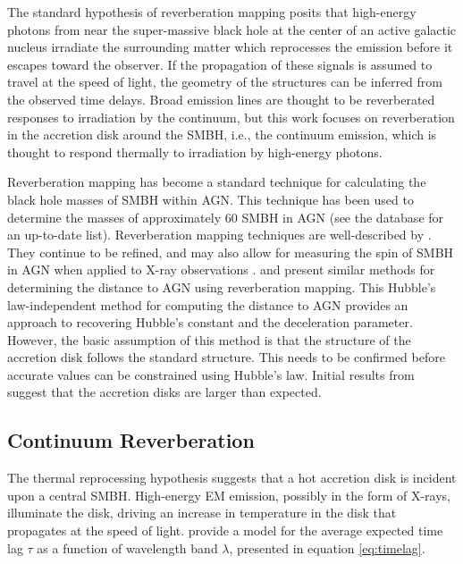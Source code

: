 \documentclass[11pt,letterpaper]{article}
\begin{document}
The standard hypothesis of reverberation mapping posits that high-energy photons from near the super-massive black hole at the center of an active galactic nucleus irradiate the surrounding matter which reprocesses the emission before it escapes toward the observer. If the propagation of these signals is assumed to travel at the speed of light, the geometry of the structures can be inferred from the observed time delays. Broad emission lines are thought to be reverberated responses to irradiation by the continuum, but this work focuses on reverberation in the accretion disk around the SMBH, i.e., the continuum emission, which is thought to respond thermally to irradiation by high-energy photons.

Reverberation mapping has become a standard technique for calculating the black hole masses of SMBH within AGN. This technique has been used to determine the masses of approximately 60 SMBH in AGN (see the \cite{2015PASP..127...67B} database for an up-to-date list). Reverberation mapping techniques are well-described by \cite{2014SSRv..183..253P}. They continue to be refined, and may also allow for measuring the spin of SMBH in AGN when applied to X-ray observations \citep{2016Natur.535..388K}. \cite{2007MNRAS.380..669C} and \cite{1999MNRAS.302L..24C} present similar methods for determining the distance to AGN using reverberation mapping. This Hubble's law-independent method for computing the distance to AGN provides an approach to recovering Hubble's constant and the deceleration parameter. However, the basic assumption of this method is that the structure of the accretion disk follows the standard \cite{1973A&A....24..337S} structure. This needs to be confirmed before accurate values can be constrained using Hubble's law. Initial results from \cite{2007MNRAS.380..669C} suggest that the accretion disks are larger than expected.

    \subsection{Continuum Reverberation}
    \label{sec:cont_reverb}
    
    The thermal reprocessing hypothesis suggests that a hot accretion disk is incident upon a central SMBH. High-energy EM emission, possibly in the form of X-rays, illuminate the disk, driving an increase in temperature in the disk that propagates at the speed of light. \cite{1999MNRAS.302L..24C} provide a model for the average expected time lag $\tau$ as a function of wavelength band $\lambda$, presented in equation \ref{eq:timelag}.
\end{document}
